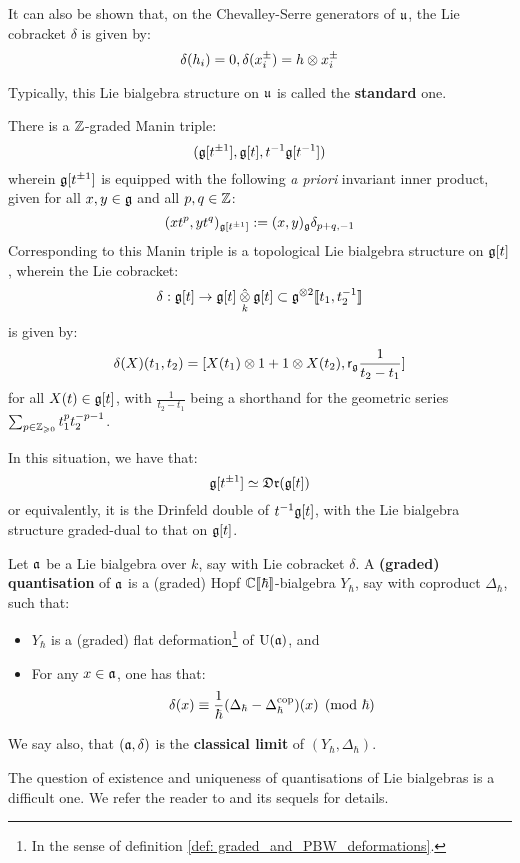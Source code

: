 \begin{example}
            It can also be shown that, on the Chevalley-Serre generators of $\mathfrak{u}$, the Lie cobracket $\delta$ is given by:
                $$\delta(h_i) = 0, \delta(x_i^{\pm}) = h \tensor x_i^{\pm}$$

            Typically, this Lie bialgebra structure on $\mathfrak{u}$ is called the \textbf{standard} one.
        \end{example}
        \begin{example} \label{example: finite_type_yangian_manin_triple}
            There is a $\mathbb{Z}$-graded Manin triple:
                $$( \mathfrak{g}[t^{\pm 1}], \mathfrak{g}[t], t^{-1}\mathfrak{g}[t^{-1}] )$$
            wherein $\mathfrak{g}[t^{\pm 1}]$ is equipped with the following \textit{a priori} invariant inner product, given for all $x, y \in \mathfrak{g}$ and all $p, q \in \mathbb{Z}$:
                $$(x t^p, y t^q)_{\mathfrak{g}[t^{\pm 1}]} := (x, y)_{\mathfrak{g}} \delta_{p + q, -1}$$
            Corresponding to this Manin triple is a topological Lie bialgebra structure on $\mathfrak{g}[t]$, wherein the Lie cobracket:
                $$\delta: \g[t] \to \g[t] \hattensor_k \g[t] \subset \g^{\tensor 2}[\![t_1, t_2^{-1}]\!]$$
            is given by:
                $$\delta(X)(t_1, t_2) = [ X(t_1) \tensor 1 + 1 \tensor X(t_2), \sfr_{\g} \frac{1}{t_2 - t_1} ]$$
            for all $X(t) \in \mathfrak{g}[t]$, with $\frac{1}{t_2 - t_1}$ being a shorthand for the geometric series $\sum_{p \in \mathbb{Z}_{\geqslant 0}} t_1^p t_2^{-p - 1}$.

            In this situation, we have that:
                $$\mathfrak{g}[t^{\pm 1}] \simeq \mathfrak{Dr}(\mathfrak{g}[t])$$
            or equivalently, it is the Drinfeld double of $t^{-1}\mathfrak{g}[t]$, with the Lie bialgebra structure graded-dual to that on $\mathfrak{g}[t]$. 
        \end{example}

        \begin{definition}[Quantisations] \label{def: quantisations}
            Let $\mathfrak{a}$ be a Lie bialgebra over $k$, say with Lie cobracket $\delta$. A \textbf{(graded) quantisation} of $\mathfrak{a}$ is a (graded) Hopf $\mathbb{C}[\![\hbar]\!]$-bialgebra $Y_{\hbar}$, say with coproduct $\Delta_{\hbar}$, such that:
            \begin{itemize}
                \item $Y_{\hbar}$ is a (graded) flat deformation\footnote{In the sense of definition \ref{def: graded_and_PBW_deformations}.} of $\mathrm{U}(\mathfrak{a})$, and
                \item For any $x \in \mathfrak{a}$, one has that:
                    $$\delta(x) \equiv \frac{1}{\hbar}(\Delta_{\hbar} - \Delta_{\hbar}^{\mathrm{cop}})(x) \pmod{\hbar}$$
            \end{itemize}
            We say also, that $(\mathfrak{a}, \delta)$ is the \textbf{classical limit} of $(Y_{\hbar}, \Delta_{\hbar})$. 
        \end{definition}
        \begin{remark}
            The question of existence and uniqueness of quantisations of Lie bialgebras is a difficult one. We refer the reader to \cite{etingof_kazhdan_quantisation_1} and its sequels for details.
        \end{remark}

